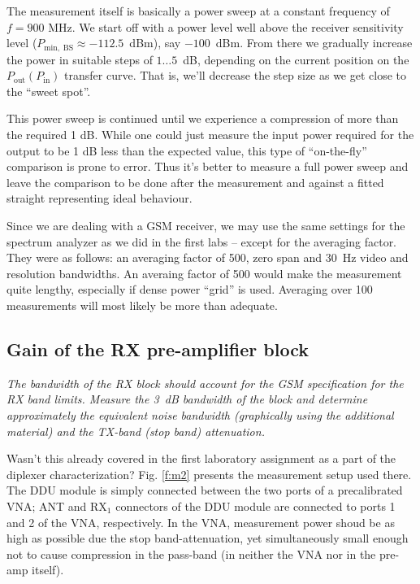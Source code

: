 \documentclass[a4paper, 12pt]{article}
\newlength{\oneLine}
\begin{document}
The measurement itself is basically a power sweep at a constant frequency of 
$f = 900$ MHz. We start off with a power level well above the receiver sensitivity 
level ($P_\mathrm{min,\;BS} \approx -112.5$~dBm), say $-100$~dBm. From there we 
gradually increase the power in suitable steps of $1 \ldots 5$~dB, depending on 
the current position on the $P_\mathrm{out}(P_\mathrm{in})$ transfer curve. That 
is, we'll decrease the step size as we get close to the ``sweet spot''. 

This power sweep is continued until we experience a compression of more than the 
required 1 dB. While one could just measure the input power required for the output 
to be 1 dB less than the expected value, this type of ``on-the-fly'' comparison 
is prone to error. Thus it's better to measure a full power sweep and leave the 
comparison to be done after the measurement and against a fitted straight representing 
ideal behaviour.

Since we are dealing with a GSM receiver, we may use the same settings for the 
spectrum analyzer as we did in the first labs -- except for the averaging factor. 
They were as follows: an averaging factor of 500, zero span and 30~Hz video and 
resolution bandwidths. An averaing factor of 500 would make the measurement quite 
lengthy, especially if dense power ``grid'' is used. Averaging over 100 measurements 
will most likely be more than adequate.


\subsection{Gain of the RX pre-amplifier block}

\textit{The bandwidth of the RX block should account for the GSM specification 
for the RX band limits. Measure the 3~dB bandwidth of the block and determine 
approximately the equivalent noise bandwidth (graphically using the additional 
material) and the TX-band (stop band) attenuation.}

\vspace*{\oneLine}
\noindent
Wasn't this already covered in the first laboratory assignment as a part of the 
diplexer characterization? Fig. \ref{f:m2} presents the measurement setup used 
there. The DDU module is simply connected between the two ports of a precalibrated 
VNA; ANT and RX$_1$ connectors of the DDU module are connected to ports 1 and 2 of 
the VNA, respectively. In the VNA, measurement power shoud be as high as possible 
due the stop band-attenuation, yet simultaneously small enough not to cause 
compression in the pass-band (in neither the VNA nor in the pre-amp itself).
\end{document}
